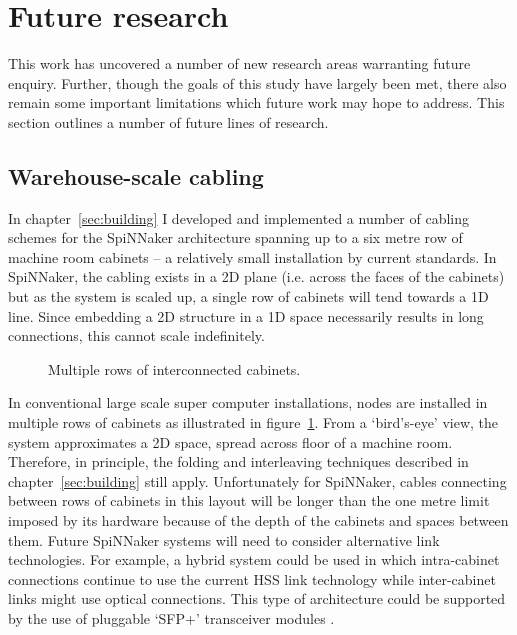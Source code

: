 	\section{Future research}
		
		This work has uncovered a number of new research areas warranting future
		enquiry. Further, though the goals of this study have largely been met,
		there also remain some important limitations which future work may hope to
		address.  This section outlines a number of future lines of research.
		
		\subsection{Warehouse-scale cabling}
			
			In chapter~\ref{sec:building} I developed and implemented a number of
			cabling schemes for the SpiNNaker architecture spanning up to a six metre
			row of machine room cabinets -- a relatively small installation by
			current standards. In SpiNNaker, the cabling exists in a 2D plane (i.e.
			across the faces of the cabinets) but as the system is scaled up, a
			single row of cabinets will tend towards a 1D line. Since embedding a 2D
			structure in a 1D space necessarily results in long connections, this
			cannot scale indefinitely.
			
			\begin{figure}
				\center
				
				\caption{Multiple rows of interconnected cabinets.}
				\label{fig:multi-row-cabling}
			\end{figure}
			
			In conventional large scale super computer installations, nodes are
			installed in multiple rows of cabinets as illustrated in
			figure~\ref{fig:multi-row-cabling}.  From a `bird's-eye' view, the system
			approximates a 2D space, spread across floor of a machine room.
			Therefore, in principle, the folding and interleaving techniques
			described in chapter~\ref{sec:building} still apply. Unfortunately for
			SpiNNaker, cables connecting between rows of cabinets in this layout will
			be longer than the one metre limit imposed by its hardware because of the
			depth of the cabinets and spaces between them.  Future SpiNNaker systems
			will need to consider alternative link technologies.  For example, a
			hybrid system could be used in which intra-cabinet connections continue
			to use the current HSS link technology while inter-cabinet links might
			use optical connections. This type of architecture could be supported by
			the use of pluggable `SFP+' transceiver modules \cite{sff01}.
		
